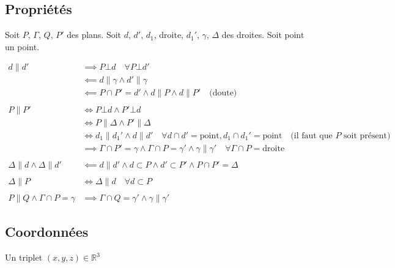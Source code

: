 \documentclass{article}
\newcommand{\R}{\mathds{R}}
\begin{document}
\subsection{Propriétés}

Soit $P$, $\Gamma$, $Q$, $P'$ des plans.
Soit $d$, $ d'$, $ d_1$, $\text{droite}$, $ d_1'$, $\gamma$, $\Delta$ des droites.
Soit $\text{point}$ un point.

\begin{equation*}
    \begin{split}
        d \parallel d' &\implies P \bot d \quad\forall P \bot d' \\
                       &\impliedby d \parallel \gamma \land d' \parallel \gamma \\
					   &\impliedby P \cap P' = d' \land d \parallel P \land d \parallel P' \quad\text{(doute)}\\\\
        P \parallel P' &\iff P\bot d \land P' \bot d \\
                       &\iff P \parallel \Delta \land P' \parallel \Delta \\
					   &\iff d_1 \parallel d_1' \land d \parallel d' \quad\forall d \cap d' = \text{point}, d_1 \cap d_1' = \text{point} \quad\text{(il faut que $P$ soit présent)}\\
                       &\implies \Gamma \cap P' = \gamma \land \Gamma \cap P = \gamma' \land \gamma \parallel \gamma' \quad\forall \Gamma \cap P = \text{droite} \\\\
        \Delta \parallel d \land \Delta \parallel d' &\impliedby d \parallel d' \land d \subset P \land d' \subset P' \land P \cap P' = \Delta \\\\
        \Delta \parallel P &\iff \Delta \parallel d \quad\forall d \subset P \\\\
        P \parallel Q \land \Gamma \cap P = \gamma &\implies \Gamma \cap Q = \gamma' \land \gamma \parallel \gamma'
    \end{split}
\end{equation*}

\subsection{Coordonnées}

Un triplet $(x, y, z)\in \R^3$
\end{document}
